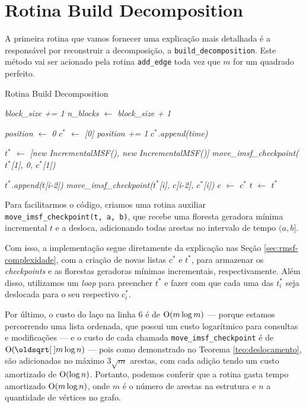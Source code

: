 \section{Rotina Build Decomposition}
\label{sec:rmsf-build-decomposition}

A primeira rotina que vamos fornecer uma explicação mais detalhada é a responsável por reconstruir a decomposição, a \texttt{build\_decomposition}. Este método vai ser acionado pela rotina \texttt{add\_edge} toda vez que $m$ for um quadrado perfeito.


\begin{algorithm}[h!]
    \caption{Rotina Build Decomposition}\label{rmsf-build-decomp}
    \begin{algorithmic}[1]
        \State \emph{block\_size += 1}
        \State \emph{n\_blocks $\gets$ block\_size + 1}

        \State \emph{position $\gets$ 0}
        \State \emph{$c^*$ $\gets$ [0]}
        \State \emph{position += 1}
        \State \emph{$c^*$.append(time)}
        \EndIf
        \EndFor

        \State \emph{$t^*$ $\gets$ [new IncrementalMSF(), new IncrementalMSF()]}
        \State \emph{move\_imsf\_checkpoint($t^*$[1], 0, $c^*$[1])}

        \For{\emph{i $\in [2, n\_blocks)$}}
        \State \emph{$t^*$.append($t$[i-2])}
        \State \emph{move\_imsf\_checkpoint($t^*$[i], $c$[i-2], $c^*$[i])}
        \EndFor
        \State \emph{$c$ $\gets$ $c^*$}
        \State \emph{$t$ $\gets$ $t^*$}
        \EndFunction
    \end{algorithmic}
\end{algorithm}

Para facilitarmos o código, criamos uma rotina auxiliar \texttt{move\_imsf\_checkpoint(t, a, b)}, que recebe uma floresta geradora mínima incremental $t$ e a desloca, adicionando todas arestas no intervalo de tempo $(a, b]$.

Com isso, a implementação segue diretamente da explicação nas Seção \ref{sec:rmsf-complexidade}, com a criação de novas listas $c^*$ e $t^*$, para armazenar os \emph{checkpoints} e as florestas geradoras mínimas incrementais, respectivamente. Além disso, utilizamos um \emph{loop} para preencher $t^*$ e fazer com que cada uma das $t^*_i$ seja deslocada para o seu respectivo $c_i^*$.

Por último, o custo do laço na linha 6 é de $\mathrm{O}(m \log m)$ --- porque estamos percorrendo uma lista ordenada, que possui um custo logarítmico para consultas e modificações --- e o custo de cada chamada \texttt{move\_imsf\_checkpoint} é de $\Oh(\sqrt{m} \log n)$ --- pois como demonstrado no Teorema \ref{teo:deslocamento}, são adicionadas no máximo $3\sqrt{m}$ arestas, com cada adição tendo um custo amortizado de $\mathrm{O}(\log n)$. Portanto, podemos conferir que a rotina gasta tempo amortizado $\mathrm{O}(m \log n)$, onde $m$ é o número de arestas na estrutura e $n$ a quantidade de vértices no grafo.

